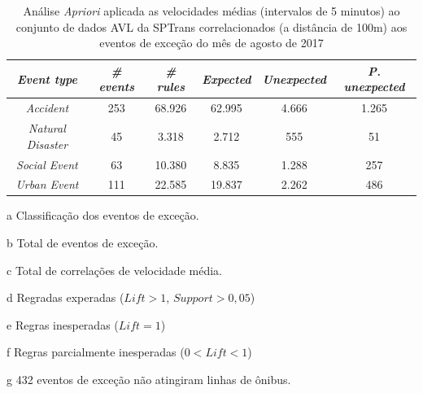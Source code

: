 \documentclass[
	12pt,				%
	oneside,			%
	a4paper,			%
	english,			%
	brazil				%
	]{abntex2ppgsi}
\begin{document}
{{\begin{apendicesenv}
\begin{table}[!htb]
\centering
\begin{threeparttable}
\caption {Análise \textit{Apriori} aplicada as velocidades médias (intervalos de 5 minutos) ao conjunto de dados AVL da SPTrans correlacionados (a distância de 100m) aos eventos de exceção do mês de agosto de 2017}
\label {tab:aprioriFull}
\begin{tabular}{c|c|c|c|c|c}
\hline
\textbf{\textit{Event type}}\tnote{a} & \textbf{\textit{\# events}}\tnote{b} & \textit{\textbf{\# rules}}\tnote{c} & \textbf{\textit{Expected}}\tnote{d} & \textbf{\textit{Unexpected}}\tnote{e} & \textbf{\textit{P. unexpected}}\tnote{f}   \\
\hline
\textit{Accident} & 253 & 68.926 & 62.995 & 4.666 & 1.265 \\
\textit{Natural Disaster} & 45 & 3.318 & 2.712 & 555 & 51 \\
\textit{Social Event} & 63 & 10.380 & 8.835 & 1.288 & 257 \\
\textit{Urban Event} & 111 & 22.585 & 19.837 & 2.262 & 486 \\
\hline
\end{tabular}
\begin{tablenotes}
            \item[a] Classificação dos eventos de exceção.
            \item[b] Total de eventos de exceção.
            \item[c] Total de correlações de velocidade média.
            \item[d] Regradas experadas ($Lift > 1$, $Support > 0,05$)
            \item[e] Regras inesperadas ($Lift = 1$)
            \item[f] Regras parcialmente inesperadas ($0 < Lift < 1$)
            \item[g] 432 eventos de exceção não atingiram linhas de ônibus.
        \end{tablenotes}
\end{threeparttable}
\end{table}


\end{apendicesenv}}}
\end{document}
